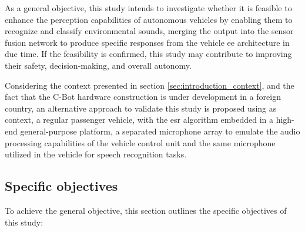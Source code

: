 As a general objective, this study intends to investigate whether it is feasible to enhance the perception capabilities of autonomous vehicles by enabling them to recognize and classify environmental sounds, merging the output into the sensor fusion network to produce specific responses from the vehicle \gls{ee} architecture in due time. If the feasibility is confirmed, this study may contribute to improving their safety, decision-making, and overall autonomy. 

Considering the context presented in section \ref{sec:introduction_context}, and the fact that the C-Bot hardware construction is under development in a foreign country, an alternative approach to validate this study is proposed using as context, a regular passenger vehicle, with the \gls{esr} algorithm embedded in a high-end general-purpose platform, a separated microphone array to emulate the audio processing capabilities of the vehicle control unit and the same microphone utilized in the vehicle for speech recognition tasks.

\subsection{Specific objectives}
\label{subsec:objectives_specifics}

To achieve the general objective, this section outlines the specific objectives of this study:

